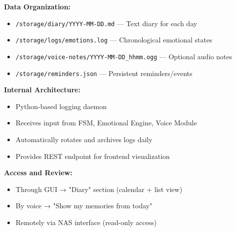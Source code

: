 \vspace{0.5cm}

\noindent\textbf{Data Organization:}
\begin{itemize}
    \item \texttt{/storage/diary/YYYY-MM-DD.md} — Text diary for each day
    \item \texttt{/storage/logs/emotions.log} — Chronological emotional states
    \item \texttt{/storage/voice-notes/YYYY-MM-DD\_hhmm.ogg} — Optional audio notes
    \item \texttt{/storage/reminders.json} — Persistent reminders/events
\end{itemize}

\vspace{0.5cm}

\noindent\textbf{Internal Architecture:}
\begin{itemize}
    \item Python-based logging daemon
    \item Receives input from FSM, Emotional Engine, Voice Module
    \item Automatically rotates and archives logs daily
    \item Provides REST endpoint for frontend visualization
\end{itemize}

\vspace{0.5cm}

\noindent\textbf{Access and Review:}
\begin{itemize}
    \item Through GUI → "Diary" section (calendar + list view)
    \item By voice → "Show my memories from today"
    \item Remotely via NAS interface (read-only access)
\end{itemize}
